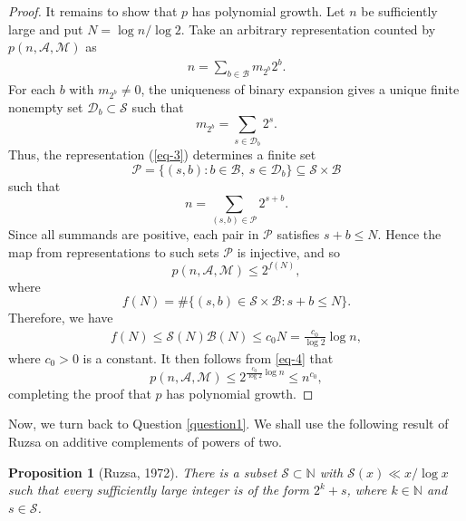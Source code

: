 \documentclass[12pt,a4paper,reqno]{amsart}
\numberwithin{equation}{section}
\theoremstyle{plain}
\newtheorem{proposition}{Proposition}
\theoremstyle{definition}
\begin{document}
\begin{proof}
It remains to show that $p$ has polynomial growth. Let $n$ be sufficiently large and put $N=\log n/\log 2$. Take an arbitrary representation counted by $p(n,\mathcal{A},\mathcal{M})$ as
\begin{align}\label{eq-3}
n=\sum_{b\in\mathscr{B}}m_{2^b}2^b.
\end{align}
For each $b$ with $m_{2^b}\ne0$, the uniqueness of binary expansion gives a unique finite nonempty set $\mathcal{D}_b\subset\mathscr{S}$ such that
$$
m_{2^b}=\sum_{s\in\mathcal{D}_b}2^s.
$$
Thus, the representation (\ref{eq-3}) determines a finite set
$$
\mathcal{P}=\big\{(s,b): b\in\mathscr{B},\ s\in\mathcal{D}_b\big\}\subseteq \mathscr{S}\times\mathscr{B}
$$
such that
$$
n=\sum_{(s,b)\in\mathcal{P}}2^{s+b}.
$$
Since all summands are positive, each pair in $\mathcal{P}$ satisfies $s+b\le N$. Hence the map from representations to such sets $\mathcal{P}$ is injective, and so
$$
p(n,\mathcal{A},\mathcal{M})\le 2^{f(N)},
$$
where
$$
f(N)=\#\big\{(s,b)\in\mathscr{S}\times\mathscr{B}:s+b\le N\big\}.
$$
Therefore, we have
\begin{align}\label{eq-4}
f(N)\le \mathscr{S}(N)\mathscr{B}(N)
\le c_0 N=\frac{c_0}{\log 2} \log n,
\end{align}
where $c_0>0$ is a constant. It then follows from \eqref{eq-4} that
$$
p(n,\mathcal{A},\mathcal{M})\le 2^{\frac{c_0}{\log 2}\log n}\le n^{c_0},
$$
completing the proof that $p$ has polynomial growth.
\end{proof}


Now, we turn back to Question \ref{question1}. We shall use the following result of Ruzsa \cite{Ru72} on additive complements of powers of two.

\begin{proposition}[Ruzsa, 1972]\label{lem1}
There is a subset $\mathcal{S}\subset \mathbb{N}$ with $\mathcal{S}(x)\ll x/\log x$ such that every sufficiently large integer is of the form $2^k+s$, where $k\in \mathbb{N}$ and $s\in \mathcal{S}$.
\end{proposition}
\end{document}
